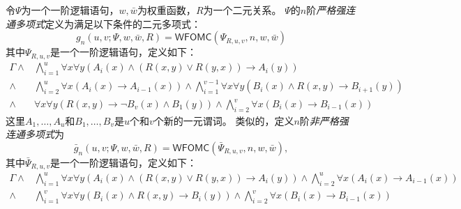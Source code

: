 \documentclass[12pt,UTF8,AutoFakeBold=3,a4paper]{ctexart} %
\newcommand{\sentence}{\Gamma}
\newcommand{\weight}{w}
\newcommand{\negweight}{\bar{w}}
\newcommand{\symwfomc}{\ensuremath{\mathsf{WFOMC}}}
\begin{document}
\begin{definition}[强连通多项式]\label{def:scp}
  令$\Psi$为一个一阶逻辑语句，$\weight, \negweight$为权重函数，$R$为一个二元关系。
  $\Psi$的$n$阶\emph{严格强连通多项式}定义为满足以下条件的二元多项式：
  \begin{equation*}
  g_n(u,v;\Psi, \weight, \negweight, R) = \symwfomc(\Psi_{R,u,v}, n, \weight, \negweight)
  \end{equation*}
  其中$\Psi_{R,u,v}$是一个一阶逻辑语句，定义如下：
  \begin{equation}
  \begin{aligned}
    \sentence \land & \bigwedge_{i=1}^u \forall x \forall y \left( A_i(x) \wedge (R(x,y) \vee R(y,x)) \to A_i(y) \right) \\
    \wedge & \bigwedge_{i = 2}^u \forall x \left( A_i(x) \to A_{i-1}(x) \right) \wedge \bigwedge_{i=1}^{v-1} \forall x \forall y \left( B_i(x) \wedge R(x,y) \to B_{i+1}(y) \right) \\
    \wedge & \forall x \forall y \left( R(x,y) \to \lnot B_v(x) \land B_1(y) \right) \wedge \bigwedge_{i = 2}^v \forall x \left( B_i(x) \to B_{i-1}(x) \right)
\end{aligned}
\label{eq:sscp}
  \end{equation}
  这里$A_1, \dots, A_u$和$B_1, \dots, B_v$是$u$个和$v$个新的一元谓词。
  类似的，定义$n$阶\emph{非严格强连通多项式}为
  \begin{equation*}
  \bar g_n(u,v;\Psi, \weight, \negweight, R) = \symwfomc(\bar \Psi_{R,u,v}, n, \weight, \negweight),
  \end{equation*}
  其中$\bar \Psi_{R,u,v}$是一个一阶逻辑语句，定义如下：
  \begin{equation}
    \begin{aligned}
      \sentence \land & \bigwedge_{i=1}^u \forall x \forall y \left( A_i(x) \wedge (R(x,y) \vee R(y,x)) \to A_i(y) \right) \wedge \bigwedge_{i = 2}^u \forall x \left( A_i(x) \to A_{i-1}(x) \right)\\
      \wedge & \bigwedge_{i=1}^v \forall x \forall y \left( B_i(x) \wedge R(x,y) \to B_i(y) \right) \wedge \bigwedge_{i = 2}^v \forall x \left( B_i(x) \to B_{i-1}(x) \right)
    \end{aligned}
    \label{eq:nscp}
  \end{equation}
\end{definition}
\end{document}
